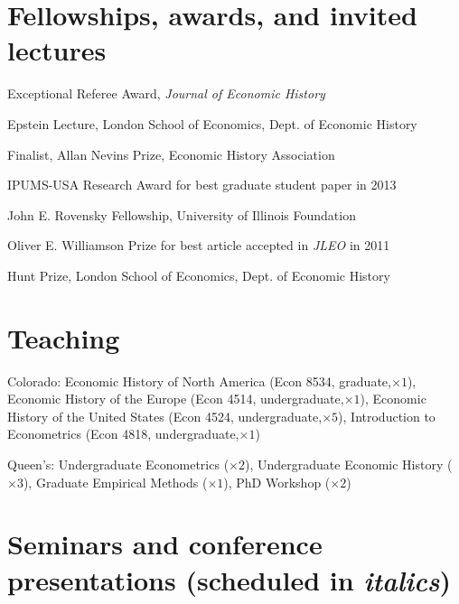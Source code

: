 \documentclass[11pt,letterpaper]{article}
\begin{document}
\section*{Fellowships, awards, and invited lectures}

\begin{description}[leftmargin=.75in,itemsep=.25em,itemindent=0in]
\item[2020]			Exceptional Referee Award, \emph{Journal of Economic History}
\item[2016]			Epstein Lecture, London School of Economics, Dept. of Economic History
\item[2014]			Finalist, Allan Nevins Prize, Economic History Association
\item[2014] 		IPUMS-USA Research Award for best graduate student paper in 2013
\item[2012 - 13] 	John E. Rovensky Fellowship, University of Illinois Foundation%
\item[2012] 		Oliver E. Williamson Prize for best article accepted in \emph{JLEO} in 2011
\item[2008] 	 	Hunt Prize, London School of Economics, Dept. of Economic History
\end{description}

\vspace{-1em}
\section*{Teaching}

\begin{description}[leftmargin=0in,itemsep=.25em,itemindent=0in]
\item 	Colorado: Economic History of North America (Econ 8534, graduate,$\times 1$), Economic History of the Europe (Econ 4514, undergraduate,$\times 1$), Economic History of the United States (Econ 4524, undergraduate,$\times 5$), Introduction to Econometrics (Econ 4818, undergraduate,$\times 1$)
\item 	Queen's: Undergraduate Econometrics ($\times 2$), Undergraduate Economic History ($\times 3$), Graduate Empirical Methods ($\times 1$), PhD Workshop ($\times 2$)
\end{description}

\vspace{-1em}
\section*{Seminars and conference presentations {\footnotesize\bf{(scheduled in \emph{italics})}}}
\end{document}
